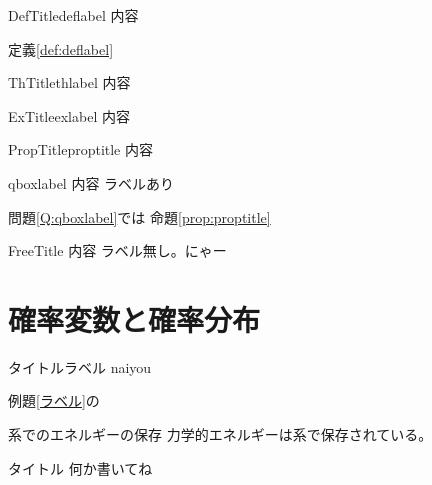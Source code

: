 \documentclass[dvipdfmx]{jsarticle}
\begin{document}
\begin{defbox}{DefTitle}{deflabel}
内容
\end{defbox}
定義\ref{def:deflabel}
\begin{thbox}{ThTitle}{thlabel}
内容
\end{thbox}
\begin{exbox}{ExTitle}{exlabel}
内容
\end{exbox}
\begin{propbox}{PropTitle}{proptitle}
内容
\end{propbox}
\begin{qbox}{qboxlabel}
内容 ラベルあり
\end{qbox}
問題\ref{Q:qboxlabel}では
命題\ref{prop:proptitle}
\begin{freebox}{FreeTitle}
内容 ラベル無し。にゃー
\end{freebox}
\section{確率変数と確率分布}
\begin{exqbox}{タイトル}{ラベル}
naiyou 
\end{exqbox}
例題\ref{ラベル}の
\begin{corbox}{系でのエネルギーの保存}{}
  力学的エネルギーは系で保存されている。
\end{corbox}
\begin{lembox}{タイトル}{}
何か書いてね
\end{lembox}
\end{document}
